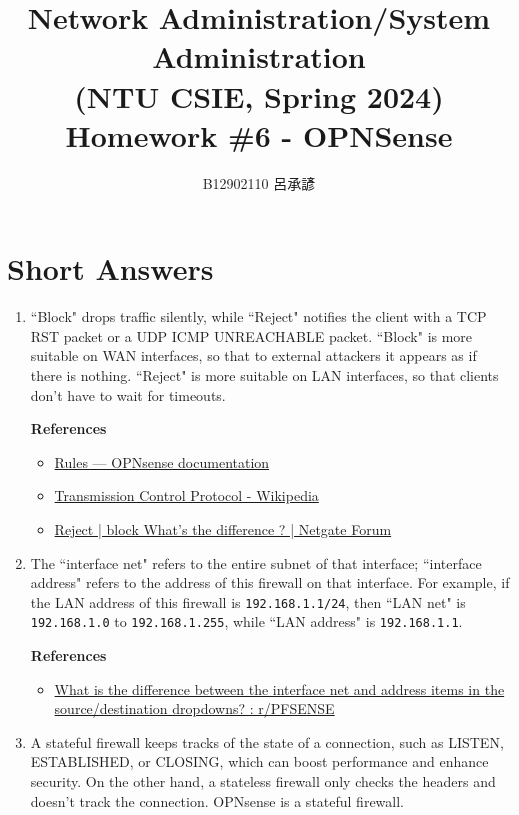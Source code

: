 \documentclass[12pt, a4paper]{article}
\title{
  \vspace{-1cm}
  Network Administration/System Administration\\
  (NTU CSIE, Spring 2024)\\
  Homework \#6 - OPNSense
}
\author{\Large B12902110 呂承諺}
\begin{document}
  \maketitle
  \section*{Short Answers}
  \begin{enumerate}
    \item ``Block" drops traffic silently, while ``Reject" notifies the client with a
    TCP RST packet or a UDP ICMP UNREACHABLE packet. ``Block" is more suitable on WAN
    interfaces, so that to external attackers it appears as if there is nothing. ``Reject"
    is more suitable on LAN interfaces, so that clients don't have to wait for timeouts.

    \textbf{References}
    \begin{itemize}
      \item \href{https://docs.opnsense.org/manual/firewall.html}{Rules — OPNsense  documentation}
      \item \href{https://en.wikipedia.org/wiki/Transmission_Control_Protocol}{Transmission Control Protocol - Wikipedia}
      \item \href{https://forum.netgate.com/topic/56854/reject-block-what-s-the-difference}{Reject | block What's the difference ? | Netgate Forum}
    \end{itemize}

    \item The ``interface net" refers to the entire subnet of that interface;
    ``interface address" refers to the address of this firewall on that interface.
    For example, if the LAN address of this firewall is \verb|192.168.1.1/24|, then
    ``LAN net" is \verb|192.168.1.0| to \verb|192.168.1.255|, while ``LAN address" is \verb|192.168.1.1|.

    \textbf{References}
    \begin{itemize}
      \item \href{https://www.reddit.com/r/PFSENSE/comments/6vyqw3/what_is_the_difference_between_the_interface_net/}{What is the difference between the interface net and address items in the source/destination dropdowns? : r/PFSENSE}
    \end{itemize}

    \item A stateful firewall keeps tracks of the state of a connection, such as LISTEN,
    ESTABLISHED, or CLOSING, which can boost performance and enhance security. On the other
    hand, a stateless firewall only checks the headers and doesn't track the connection.
    OPNsense is a stateful firewall.


\end{enumerate}
\end{document}
